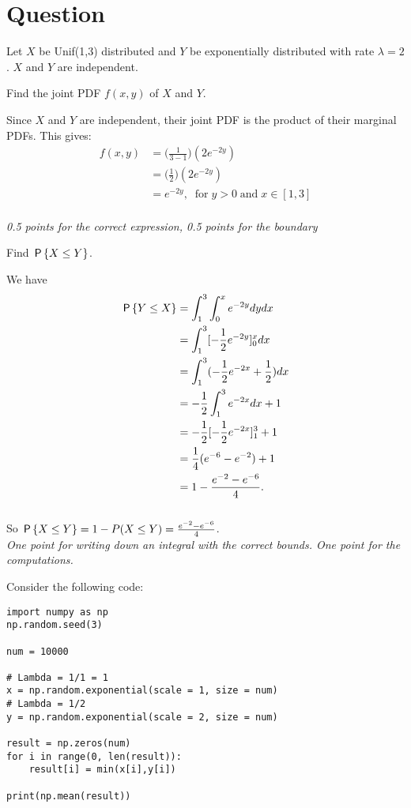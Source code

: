 \section{Question}


Let $X$ be Unif(1,3) distributed and $Y$ be exponentially distributed with rate $\lambda = 2$. $X$ and $Y$ are independent.
\begin{exercise}[1]
Find the joint PDF $f(x,y)$ of $X$ and $Y$.
\begin{solution}
    Since $X$ and $Y$ are independent, their joint PDF is the product of their marginal PDFs. This gives:
    \begin{align*}
        f(x,y) &= \Big(\frac{1}{3-1}\Big)(2e^{-2y}) \\
        &= \Big(\frac{1}{2}\Big)(2e^{-2y}) \\
        &= e^{-2y}, \; \; \text{for} \; y > 0 \; \text{and} \; x \in [1,3]
    \end{align*} \\
    \textit{0.5 points for the correct expression, 0.5 points for the boundary}
\end{solution}
\end{exercise}

\begin{exercise}[2]
Find $\P{X \leq Y}$.
\begin{solution}
    We have
    \begin{align*}
        \P{Y \leq X} &= \int_1^3 \int_0^x e^{-2y} dy dx \\
        &= \int_1^3 [-\frac{1}{2} e^{-2y} ]_0^x dx \\
        &= \int_1^3 (-\frac{1}{2} e^{-2x} + \frac{1}{2}) dx \\
        &= -\frac{1}{2}  \int_1^3 e^{-2x} dx + 1 \\
        &= -\frac{1}{2}  [ -\frac{1}{2} e^{-2x} ]_1^3 + 1 \\
        &= \frac{1}{4} (e^{-6} - e^{-2}) + 1 \\
        &= 1 - \frac{e^{-2} - e^{-6}}{4}.
    \end{align*}\\
    So $\P{X \leq Y} = 1 - P(X \leq Y) = \frac{e^{-2} - e^{-6}}{4}$.\\
\textit{One point for writing down an integral with the correct bounds. One point for the computations.}
\end{solution}
\end{exercise}
\noindent Consider the following code:
\begin{verbatim}
import numpy as np
np.random.seed(3)

num = 10000

# Lambda = 1/1 = 1
x = np.random.exponential(scale = 1, size = num)
# Lambda = 1/2
y = np.random.exponential(scale = 2, size = num)

result = np.zeros(num)
for i in range(0, len(result)):
    result[i] = min(x[i],y[i])

print(np.mean(result))
\end{verbatim}

